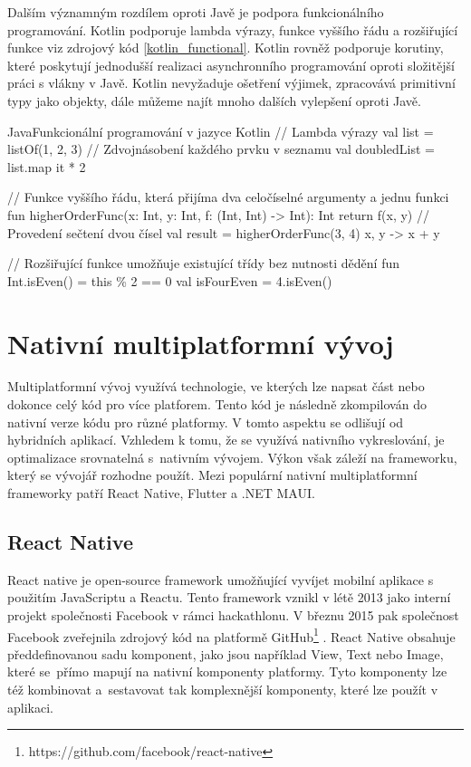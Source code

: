 \documentclass[czech, bc, kiv, he, iso690numb]{fasthesis}
\begin{document}
Dalším významným rozdílem oproti Javě je podpora funkcionálního programování. Kotlin podporuje lambda výrazy, funkce vyššího řádu a rozšiřující funkce viz zdrojový kód \ref{kotlin_functional}. Kotlin rovněž podporuje korutiny, které poskytují jednodušší realizaci asynchronního programování oproti složitější práci s vlákny v Javě. Kotlin nevyžaduje ošetření výjimek, zpracovává primitivní typy jako objekty, dále můžeme najít mnoho dalších vylepšení oproti Javě. \cite{moskala2017android} \cite{jemerov2017kotlin} \cite{kotlin-vs-java}

\begin{code}{Java}{Funkcionální programování v jazyce Kotlin \label{kotlin_functional}}
// Lambda výrazy
val list = listOf(1, 2, 3)
// Zdvojnásobení každého prvku v seznamu
val doubledList = list.map { it * 2 }

// Funkce vyššího řádu, která přijíma dva celočíselné argumenty a jednu funkci
fun higherOrderFunc(x: Int, y: Int, f: (Int, Int) -> Int): Int {
    return f(x, y)
}
// Provedení sečtení dvou čísel
val result = higherOrderFunc(3, 4) { x, y -> x + y }

// Rozšiřující funkce umožňuje existující třídy bez nutnosti dědění
fun Int.isEven() = this \% 2 == 0
val isFourEven = 4.isEven()
\end{code}

\section{Nativní multiplatformní vývoj} \label{Cross_platform_development}

Multiplatformní vývoj využívá technologie, ve kterých lze napsat část nebo dokonce celý kód pro více platforem. Tento kód je následně zkompilován do nativní verze kódu pro různé platformy. V tomto aspektu se odlišují od hybridních aplikací. Vzhledem k tomu, že se využívá nativního vykreslování, je optimalizace srovnatelná s~nativním vývojem. Výkon však záleží na frameworku, který se vývojář rozhodne použít. Mezi populární nativní multiplatformní frameworky patří React Native, Flutter a .NET MAUI. \cite{Difference-native-non-native} \cite{multiplatform-apps-yojji}

\subsection{React Native} \label{React_native}

React native je open-source framework umožňující vyvíjet mobilní aplikace s použitím JavaScriptu a Reactu. Tento framework vznikl v létě 2013 jako interní projekt společnosti Facebook v rámci hackathlonu. V březnu 2015 pak společnost Facebook zveřejnila zdrojový kód na platformě GitHub\footnote{https://github.com/facebook/react-native} \cite{brainhub-react-native}. React Native obsahuje předdefinovanou sadu komponent, jako jsou například View, Text nebo Image, které se~přímo mapují na nativní komponenty platformy. Tyto komponenty lze též kombinovat a~sestavovat tak komplexnější komponenty, které lze použít v aplikaci. \cite{react-native} \cite{what-is-react-native}
\end{document}

